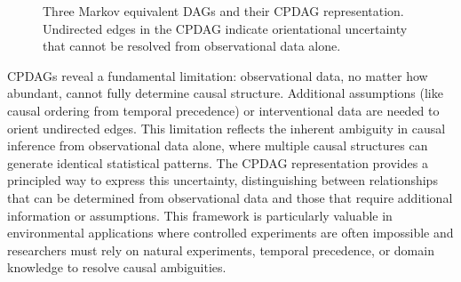 \begin{figure}[H]
	\centering
	\caption[Three Markov equivalent DAGs and their CPDAG representation]{Three Markov equivalent DAGs and their CPDAG representation. Undirected edges in the CPDAG indicate orientational uncertainty that cannot be resolved from observational data alone.}
	\label{fig:cpdag_example}
\end{figure}

CPDAGs reveal a fundamental limitation: observational data, no matter how abundant, cannot fully determine causal structure. Additional assumptions (like causal ordering from temporal precedence) or interventional data are needed to orient undirected edges. This limitation reflects the inherent ambiguity in causal inference from observational data alone, where multiple causal structures can generate identical statistical patterns. The CPDAG representation provides a principled way to express this uncertainty, distinguishing between relationships that can be determined from observational data and those that require additional information or assumptions. This framework is particularly valuable in environmental applications where controlled experiments are often impossible and researchers must rely on natural experiments, temporal precedence, or domain knowledge to resolve causal ambiguities.

